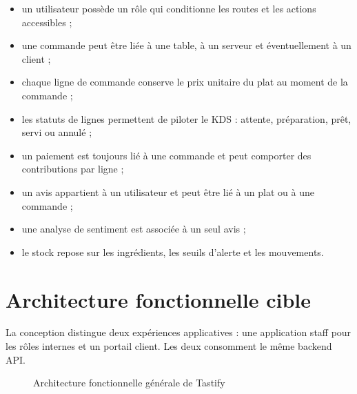 \begin{itemize}
  \item un utilisateur possède un rôle qui conditionne les routes et les actions accessibles ;
  \item une commande peut être liée à une table, à un serveur et éventuellement à un client ;
  \item chaque ligne de commande conserve le prix unitaire du plat au moment de la commande ;
  \item les statuts de lignes permettent de piloter le KDS : attente, préparation, prêt, servi ou annulé ;
  \item un paiement est toujours lié à une commande et peut comporter des contributions par ligne ;
  \item un avis appartient à un utilisateur et peut être lié à un plat ou à une commande ;
  \item une analyse de sentiment est associée à un seul avis ;
  \item le stock repose sur les ingrédients, les seuils d'alerte et les mouvements.
\end{itemize}

\section{Architecture fonctionnelle cible}
La conception distingue deux expériences applicatives : une application staff pour les rôles internes et un portail client. Les deux consomment le même backend API.

\begin{figure}[H]
\centering
{}
\caption{Architecture fonctionnelle générale de Tastify}
\label{fig:architecture-fonctionnelle}
\end{figure}

